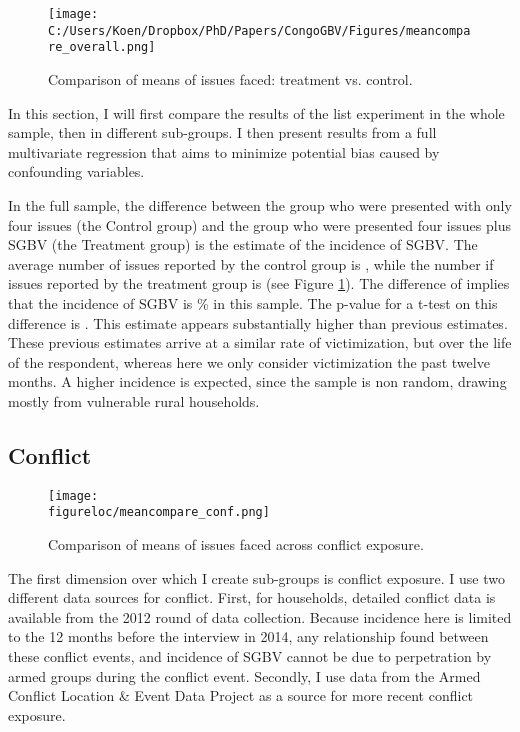 \documentclass[10pt,a4paper,abstract=on]{scrartcl} %
\newcommand{\figureloc}{C:/Users/Koen/Dropbox/PhD/Papers/CongoGBV/Figures}
\begin{document}
\begin{figure}[htb]
  \texttt{[image: C:/Users/Koen/Dropbox/PhD/Papers/CongoGBV/Figures/meancompare\_overall.png]}
  \caption{Comparison of means of issues faced: treatment vs. control.}
  \label{fig:meancompare_overall}
\end{figure}

In this section, I will first compare the results of the list experiment in the whole sample, then in different sub-groups. I then present results from a full multivariate regression that aims to minimize potential bias caused by confounding variables. 

In the full sample, the difference between the group who were presented with only four issues (the Control group) and the group who were presented four issues plus SGBV (the Treatment group) is the estimate of the incidence of SGBV. The average number of issues reported by the control group is , while the number if issues reported by the treatment group is  (see Figure \ref{fig:meancompare_overall}). The difference of  implies that the incidence of SGBV is \% in this sample. The p-value for a t-test on this difference is . This estimate appears substantially higher than previous estimates. These previous estimates 
 \citep[e.g.][]{Peterson2018,Stark2017,Johnson2010} arrive at a similar rate of victimization, but over the life of the respondent, whereas here we only consider victimization the past twelve months. A higher incidence is expected, since the sample is non random, drawing mostly from vulnerable rural households. 


\subsection*{Conflict}
\begin{figure}[htb]
  \texttt{[image: \\figureloc/meancompare\_conf.png]}
  \caption{Comparison of means of issues faced across conflict exposure.}
  \label{fig:meancompare_conf}
\end{figure}

The first dimension over which I create sub-groups is conflict exposure. I use two different data sources for conflict. First, for  households, detailed conflict data is available from the 2012 round of data collection. Because incidence here is limited to the 12 months before the interview in 2014, any relationship found between these conflict events, and incidence of SGBV cannot be due to perpetration by armed groups during the conflict event. Secondly, I use data from the Armed Conflict Location \& Event Data Project \citep[ACLED;][]{Raleigh2010} as a source for more recent conflict exposure. 
\end{document}
